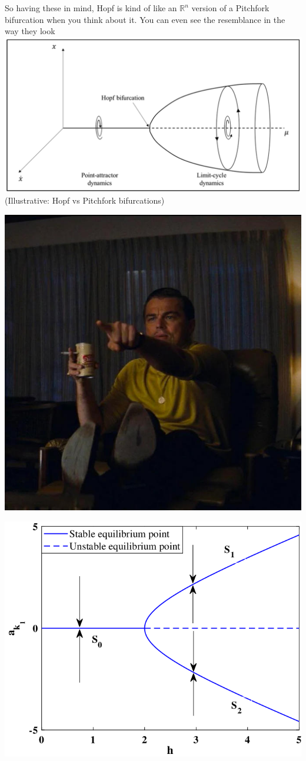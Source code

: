 \documentclass[aspectratio=169]{beamer}
\begin{document}
\begin{frame}
	So having these in mind, Hopf is kind of like an $\mathbb{R}^n$ version of a Pitchfork bifurcation when you think about it.
	You can even see the resemblance in the way they look
	\centering
	\includegraphics[width=0.8\linewidth]{pics/hopf-bif-pic.png}\\
	\tiny (Illustrative: Hopf vs Pitchfork bifurcations)
\end{frame}

\begin{frame}
	\centering
	\includegraphics[width=0.54\linewidth]{pics/leo.jpg}
\end{frame}

\begin{frame}
	\centering
	\includegraphics[width=0.7\linewidth]{pics/pitchfork-photo.png}
\end{frame}
\end{document}
